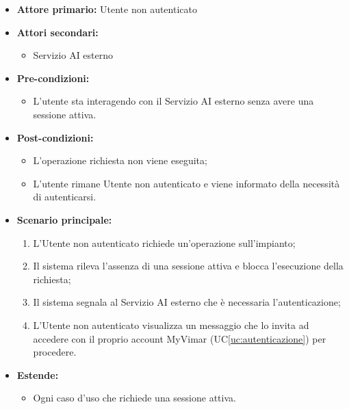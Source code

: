 \documentclass[11pt, a4paper]{article}
\newcounter{uc}                            %
\newcommand{\ucref}[1]{UC\ref{uc:#1}}
\begin{document}
\begin{itemize}[label=\textbullet]
  \item \textbf{Attore primario:} Utente non autenticato
  \item \textbf{Attori secondari:}
  \begin{itemize}[label=‣]
    \item Servizio AI esterno
  \end{itemize}
  \item \textbf{Pre-condizioni:}
  \begin{itemize}[label=‣]
    \item L'utente sta interagendo con il Servizio AI esterno senza avere una sessione attiva.
  \end{itemize}
  \item \textbf{Post-condizioni:}
  \begin{itemize}[label=‣]
    \item L'operazione richiesta non viene eseguita;
    \item L'utente rimane Utente non autenticato e viene informato della necessità di autenticarsi.
  \end{itemize}
  \item \textbf{Scenario principale:}
  \begin{enumerate}
    \item L'Utente non autenticato richiede un'operazione sull'impianto;
    \item Il sistema rileva l'assenza di una sessione attiva e blocca l'esecuzione della richiesta;
    \item Il sistema segnala al Servizio AI esterno che è necessaria l'autenticazione;
    \item L'Utente non autenticato visualizza un messaggio che lo invita ad accedere con il proprio account MyVimar (\ucref{autenticazione}) per procedere.
  \end{enumerate}
  \item \textbf{Estende:}
  \begin{itemize}[label=‣]
    \item Ogni caso d'uso che richiede una sessione attiva.
  \end{itemize}
\end{itemize}

\endgroup

\begingroup
{}
\end{document}
